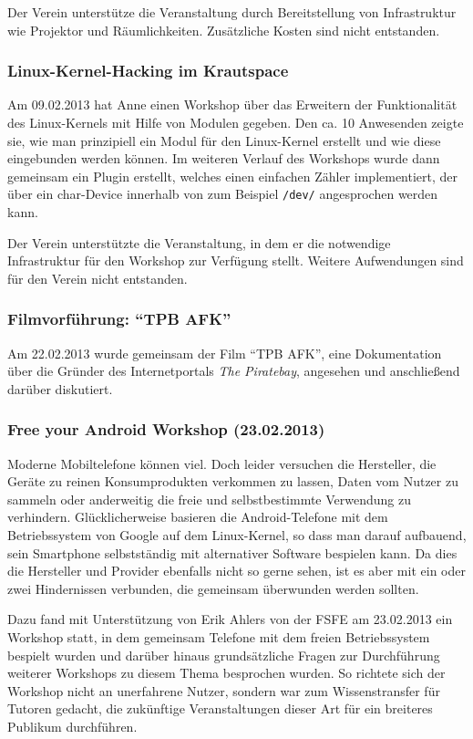 \documentclass[10pt,DIV16]{scrartcl}
\begin{document}
Der Verein unterstütze die Veranstaltung durch Bereitstellung von
Infrastruktur wie Projektor und Räum\-lich\-kei\-ten. Zusätzliche Kosten sind
nicht entstanden.

\subsubsection{Linux-Kernel-Hacking im Krautspace}

Am 09.02.2013 hat Anne einen Workshop über das Erweitern der
Funktionalität des Linux-Kernels mit Hilfe von Modulen gegeben. Den ca.
10 Anwesenden zeigte sie, wie man prinzipiell ein Modul für den
Linux-Kernel erstellt und wie diese eingebunden werden können. Im
weiteren Verlauf des Workshops wurde dann gemeinsam ein Plugin
erstellt, welches einen einfachen Zähler implementiert, der über ein
char-Device innerhalb von zum Beispiel \texttt{/dev/} angesprochen
werden kann.

Der Verein unterstützte die Veranstaltung, in dem er die notwendige
Infrastruktur für den Workshop zur Verfügung stellt. Weitere
Aufwendungen sind für den Verein nicht entstanden.

\subsubsection{Filmvorführung: "`TPB AFK"'}

Am 22.02.2013 wurde gemeinsam der Film "`TPB AFK"', eine
Dokumentation über die Gründer des Internetportals \textit {The
Piratebay}, angesehen und anschließend darüber diskutiert.


\subsubsection{Free your Android Workshop (23.02.2013)}
\label{sec:free-your-android}

Moderne Mobiltelefone können viel. Doch leider versuchen die Hersteller,
die Geräte zu reinen Konsumprodukten verkommen zu lassen, Daten vom
Nutzer zu sammeln oder anderweitig die freie und selbstbestimmte
Verwendung zu verhindern. Glücklicherweise basieren die
Android-Telefone mit dem Betriebssystem von Google auf dem
Linux-Kernel, so dass man darauf aufbauend, sein Smartphone
selbstständig mit alternativer Software bespielen kann. Da dies die
Hersteller und Provider ebenfalls nicht so gerne sehen, ist es
aber mit ein oder zwei Hindernissen verbunden, die gemeinsam
überwunden werden sollten.

Dazu fand mit Unterstützung von Erik Ahlers von der FSFE am 23.02.2013
ein Workshop statt, in dem gemeinsam Telefone mit dem freien
Betriebssystem bespielt wurden und darüber hinaus grundsätzliche
Fragen zur Durchführung weiterer Workshops zu diesem Thema
besprochen wurden. So richtete sich der Workshop nicht an unerfahrene
Nutzer, sondern war zum Wissenstransfer für Tutoren gedacht, die zukünftige
Veranstaltungen dieser Art für ein breiteres Publikum durchführen.
\end{document}
